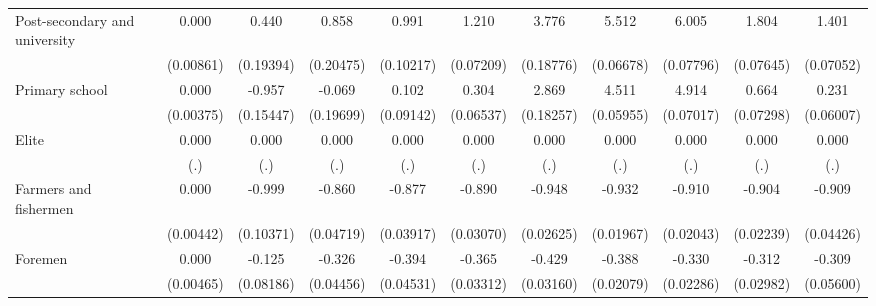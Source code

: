 {\begin{tabular}{l*{10}{c}}
Post-secondary and university&       0.000         &       0.440\sym{*}  &       0.858\sym{***}&       0.991\sym{***}&       1.210\sym{***}&       3.776\sym{***}&       5.512\sym{***}&       6.005\sym{***}&       1.804\sym{***}&       1.401\sym{***}\\
                    &   (0.00861)         &   (0.19394)         &   (0.20475)         &   (0.10217)         &   (0.07209)         &   (0.18776)         &   (0.06678)         &   (0.07796)         &   (0.07645)         &   (0.07052)         \\
Primary school      &       0.000         &      -0.957\sym{***}&      -0.069         &       0.102         &       0.304\sym{***}&       2.869\sym{***}&       4.511\sym{***}&       4.914\sym{***}&       0.664\sym{***}&       0.231\sym{***}\\
                    &   (0.00375)         &   (0.15447)         &   (0.19699)         &   (0.09142)         &   (0.06537)         &   (0.18257)         &   (0.05955)         &   (0.07017)         &   (0.07298)         &   (0.06007)         \\
Elite               &       0.000         &       0.000         &       0.000         &       0.000         &       0.000         &       0.000         &       0.000         &       0.000         &       0.000         &       0.000         \\
                    &         (.)         &         (.)         &         (.)         &         (.)         &         (.)         &         (.)         &         (.)         &         (.)         &         (.)         &         (.)         \\
Farmers and fishermen&       0.000         &      -0.999\sym{***}&      -0.860\sym{***}&      -0.877\sym{***}&      -0.890\sym{***}&      -0.948\sym{***}&      -0.932\sym{***}&      -0.910\sym{***}&      -0.904\sym{***}&      -0.909\sym{***}\\
                    &   (0.00442)         &   (0.10371)         &   (0.04719)         &   (0.03917)         &   (0.03070)         &   (0.02625)         &   (0.01967)         &   (0.02043)         &   (0.02239)         &   (0.04426)         \\
Foremen             &       0.000         &      -0.125         &      -0.326\sym{***}&      -0.394\sym{***}&      -0.365\sym{***}&      -0.429\sym{***}&      -0.388\sym{***}&      -0.330\sym{***}&      -0.312\sym{***}&      -0.309\sym{***}\\
                    &   (0.00465)         &   (0.08186)         &   (0.04456)         &   (0.04531)         &   (0.03312)         &   (0.03160)         &   (0.02079)         &   (0.02286)         &   (0.02982)         &   (0.05600)         \\

\end{tabular}}
